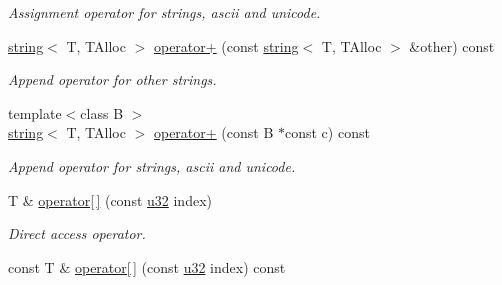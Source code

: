\begin{DoxyCompactItemize}
\begin{DoxyCompactList}\small\item\em Assignment operator for strings, ascii and unicode. \end{DoxyCompactList}\item 
\hyperlink{classirr_1_1core_1_1string}{string}$<$ T, T\+Alloc $>$ \hyperlink{classirr_1_1core_1_1string_a33a88cfd68bf321b2a8e1469e25d7f1a}{operator+} (const \hyperlink{classirr_1_1core_1_1string}{string}$<$ T, T\+Alloc $>$ \&other) const \hypertarget{classirr_1_1core_1_1string_a33a88cfd68bf321b2a8e1469e25d7f1a}{}\label{classirr_1_1core_1_1string_a33a88cfd68bf321b2a8e1469e25d7f1a}

\begin{DoxyCompactList}\small\item\em Append operator for other strings. \end{DoxyCompactList}\item 
{\footnotesize template$<$class B $>$ }\\\hyperlink{classirr_1_1core_1_1string}{string}$<$ T, T\+Alloc $>$ \hyperlink{classirr_1_1core_1_1string_a0ef93540a49be33dd5d4438d2f685ac1}{operator+} (const B $\ast$const c) const \hypertarget{classirr_1_1core_1_1string_a0ef93540a49be33dd5d4438d2f685ac1}{}\label{classirr_1_1core_1_1string_a0ef93540a49be33dd5d4438d2f685ac1}

\begin{DoxyCompactList}\small\item\em Append operator for strings, ascii and unicode. \end{DoxyCompactList}\item 
T \& \hyperlink{classirr_1_1core_1_1string_af1b5093bf01b2472520e6cefa1f7c235}{operator\mbox{[}$\,$\mbox{]}} (const \hyperlink{namespaceirr_a0416a53257075833e7002efd0a18e804}{u32} index)\hypertarget{classirr_1_1core_1_1string_af1b5093bf01b2472520e6cefa1f7c235}{}\label{classirr_1_1core_1_1string_af1b5093bf01b2472520e6cefa1f7c235}

\begin{DoxyCompactList}\small\item\em Direct access operator. \end{DoxyCompactList}\item 
const T \& \hyperlink{classirr_1_1core_1_1string_a916f143e1c422024653bdb071f655cbd}{operator\mbox{[}$\,$\mbox{]}} (const \hyperlink{namespaceirr_a0416a53257075833e7002efd0a18e804}{u32} index) const \hypertarget{classirr_1_1core_1_1string_a916f143e1c422024653bdb071f655cbd}{}\label{classirr_1_1core_1_1string_a916f143e1c422024653bdb071f655cbd}


\end{DoxyCompactItemize}
